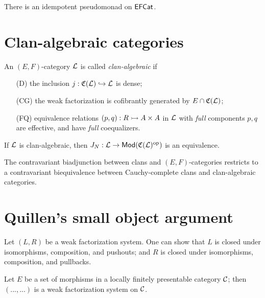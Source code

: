 \documentclass[a4paper]{article}
\begin{document}
There is an idempotent pseudomonad on $\mathsf{EFCat}$.

\section{Clan-algebraic categories}

\begin{definition}
  An $(E,F)$-category $\mathcal{L}$ is called \emph{clan-algebraic} if
  \begin{enumerate}
  \item[(D)] the inclusion $j : \mathfrak{C}(\mathcal{L}) \hookrightarrow \mathcal{L}$ is dense;
  \item[(CG)] the weak factorization is cofibrantly generated by $E \cap \mathfrak{C}(\mathcal{L})$;
  \item[(FQ)] equivalence relations $(p,q) : R \rightarrowtail A \times A$ in $\mathcal{L}$ with \emph{full} components $p, q$ are effective, and have \emph{full} coequalizers.
  \end{enumerate}
\end{definition}

\begin{theorem}
  If $\mathcal{L}$ is clan-algebraic, then $J_N : \mathcal{L} \to \mathsf{Mod}(\mathfrak{C}(\mathcal{L})^{\mathrm{op}})$ is an equivalence.
\end{theorem}

\begin{theorem}
  The contravariant biadjunction between clans and $(E,F)$-categories restricts to a contravariant biequivalence between Cauchy-complete clans and clan-algebraic categories.
\end{theorem}

\section{Quillen's small object argument}

Let $(L,R)$ be a weak factorization system.
One can show that $L$ is closed under isomorphisms, composition, and pushouts; and $R$ is closed under isomorphisms, composition, and pullbacks.

\begin{theorem}
  Let $E$ be a set of morphisms in a locally finitely presentable category $\mathcal{C}$; then $(...,...)$ is a weak factorization system on $\mathcal{C}$.
\end{theorem}

\printbibliography
\end{document}
